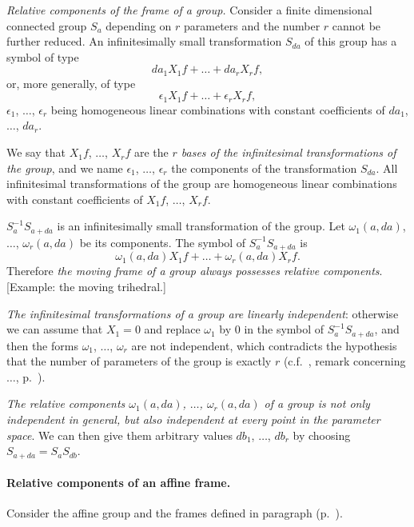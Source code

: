 \emph{Relative components of the frame of a group.} Consider a finite dimensional connected group $S_{a}$ depending on $r$ parameters and the number $r$ cannot be further reduced. An infinitesimally small transformation $S_{da}$ of this group has a symbol of type
\[
da_{1}X_{1}f+\dots+da_{r}X_{r}f,
\]
or, more generally, of type
\[
\epsilon_{1}X_{1}f+\dots+\epsilon_{r}X_{r}f,
\]
$\epsilon_{1}$, $\dots$, $\epsilon_{r}$ being homogeneous linear combinations with constant coefficients of $da_{1}$, $\dots$, $da_{r}$.

We say that $X_{1}f$, $\dots$, $X_{r}f$ are the \emph{$r$ bases of the infinitesimal transformations of the group}, and we name $\epsilon_{1}$, $\dots$, $\epsilon_{r}$ the components of the transformation $S_{da}$. All infinitesimal transformations of the group are homogeneous linear combinations with constant coefficients of $X_{1}f$, $\dots$, $X_{r}f$.

$S^{-1}_{a}S_{a+da}$ is an infinitesimally small transformation of the group. Let $\omega_{1}(a,da)$, $\dots$, $\omega_{r}(a,da)$ be its components. The symbol of $S_{a}^{-1}S_{a+da}$ is
\[
\omega_{1}(a,da)X_{1}f+\dots+\omega_{r}(a,da)X_{r}f.
\]
Therefore \emph{the moving frame of a group always possesses relative components}. [Example: the moving trihedral.]

\emph{The infinitesimal transformations of a group are linearly independent}: otherwise we can assume that $X_{1}=0$ and replace $\omega_{1}$ by $0$ in the symbol of $S_{a}^{-1}S_{a+da}$, and then the forms $\omega_{1}$, $\dots$, $\omega_{r}$ are not independent, which contradicts the hypothesis that the number of parameters of the group is exactly $r$ (c.f.~, remark concerning $\dots$, p.~\pageref{sec:70}).

\emph{The relative components $\omega_{1}(a,da)$, $\dots$, $\omega_{r}(a,da)$ of a group is not only independent in general, but also independent at every point in the parameter space}. We can then give them arbitrary values $db_{1}$, $\dots$, $db_{r}$ by choosing $S_{a+da}=S_{a}S_{db}$.

\paragraph{Relative components of an affine frame.}
\label{sec:72}
Consider the affine group and the frames defined in paragraph  (p.~\pageref{sec:65}).

